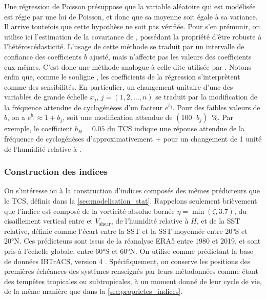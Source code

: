\documentclass[../main.tex]{subfiles}
\begin{document}
Une régression de Poisson présuppose que la variable aléatoire qui est modélisée est régie par une loi de Poisson, et donc que sa moyenne soit égale à sa
variance. Il arrive toutefois que cette hypothèse ne soit pas vérifiée. Pour s'en prémunir, on utilise ici l'estimation de la covariance de
\textcite{mackinnon_heteroskedasticityconsistent_1985}, possédant la propriété d'être robuste à l'hétéroscédasticité. L'usage de cette méthode se traduit par un
intervalle de confiance des coefficients $b$ ajusté, mais n'affecte pas les valeurs des coefficients eux-mêmes. C'est donc une méthode analogue à celle dite
 utilisée par \textcite{tippett_poisson_2011}. Notons enfin que, comme le souligne \textcite{tippett_poisson_2011}, les coefficients de
la régression s'interprètent comme des sensibilités. En particulier, un changement unitaire d'une des variables de grande échelle $x_j$, $j = (1, 2, \ldots, n)$
se traduit par la modification de la fréquence attendue de cyclogénèses d'un facteur $e^{b_j}$. Pour des faibles valeurs de $b$, on a $e^{b_j} \approx 1 + b_j$,
soit une modification attendue de $(100 \cdot b_j)$~\%. Par exemple, le coefficient $b_H = \num{0.05}$ du TCS indique une réponse attendue de la fréquence de
cyclogénèses d'approximativement $+$ pour un changement de 1 unité de l'humidité relative à .

\subsubsection*{Construction des indices}\label{sec:construction_indices}

On s'intéresse ici à la construction d'indices composés des mêmes prédicteurs que le TCS, définis dans la \cref{sec:modelisation_stat}. Rappelons seulement
brièvement que l'indice est composé de la vorticité absolue bornée $\eta = \min(\zeta, \num{3.7})$, du cisaillement vertical entre  et 
$V_{\mathrm{shear}}$, de l'humidité relative à  $H$, et de la SST relative, définie comme l'écart entre la SST et la SST moyennée entre \ang{20}S et
\ang{20}N. Ces prédicteurs sont issus de la réanalyse ERA5 entre \num{1980} et \num{2019}, et sont pris à l'échelle globale, entre \ang{60}S et \ang{60}N. On
utilise comme prédictant la base de données IBTrACS, version 4 \parencite{knapp_international_2010}. Spécifiquement, on conserve les positions des premières
échéances des systèmes renseignés par leurs métadonnées comme étant des tempêtes tropicales ou subtropicales, à un moment donné de leur cycle de vie, de la même
manière que dans la \cref{sec:proprietes_indices}.
\end{document}
